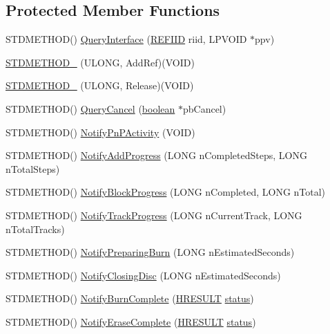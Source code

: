 \subsection*{Protected Member Functions}
\begin{DoxyCompactItemize}
\item 
S\+T\+D\+M\+E\+T\+H\+OD() \hyperlink{class_port_burn_progress_af13ab80c3a84826183cc542d091b0b1e}{Query\+Interface} (\hyperlink{px__win__ds_8c_a80ec49c8ae61e234197d5071d2df497d}{R\+E\+F\+I\+ID} riid, L\+P\+V\+O\+ID $\ast$ppv)
\item 
\hyperlink{class_port_burn_progress_a290522b6f07a4ff6ed2ce650bb3b7a46}{S\+T\+D\+M\+E\+T\+H\+O\+D\+\_\+} (U\+L\+O\+NG, Add\+Ref)(V\+O\+ID)
\item 
\hyperlink{class_port_burn_progress_a40d61559f171eca900115392db6dc586}{S\+T\+D\+M\+E\+T\+H\+O\+D\+\_\+} (U\+L\+O\+NG, Release)(V\+O\+ID)
\item 
S\+T\+D\+M\+E\+T\+H\+OD() \hyperlink{class_port_burn_progress_a35455bb10ed80d2eb80462b19765859d}{Query\+Cancel} (\hyperlink{cext_8h_a7670a4e8a07d9ebb00411948b0bbf86d}{boolean} $\ast$pb\+Cancel)
\item 
S\+T\+D\+M\+E\+T\+H\+OD() \hyperlink{class_port_burn_progress_a26ebcc7b69df400a910a9670fc1e2d48}{Notify\+Pn\+P\+Activity} (V\+O\+ID)
\item 
S\+T\+D\+M\+E\+T\+H\+OD() \hyperlink{class_port_burn_progress_a52417e3ed6e582c5cec8eb49620099d5}{Notify\+Add\+Progress} (L\+O\+NG n\+Completed\+Steps, L\+O\+NG n\+Total\+Steps)
\item 
S\+T\+D\+M\+E\+T\+H\+OD() \hyperlink{class_port_burn_progress_ad8149de00707fde296c46bf137ee9529}{Notify\+Block\+Progress} (L\+O\+NG n\+Completed, L\+O\+NG n\+Total)
\item 
S\+T\+D\+M\+E\+T\+H\+OD() \hyperlink{class_port_burn_progress_a343449b38df0598ac453bda0dd1bdcaa}{Notify\+Track\+Progress} (L\+O\+NG n\+Current\+Track, L\+O\+NG n\+Total\+Tracks)
\item 
S\+T\+D\+M\+E\+T\+H\+OD() \hyperlink{class_port_burn_progress_a94f31073c21939e3b8d4b77e02113e75}{Notify\+Preparing\+Burn} (L\+O\+NG n\+Estimated\+Seconds)
\item 
S\+T\+D\+M\+E\+T\+H\+OD() \hyperlink{class_port_burn_progress_a8968f4d5363998d9e66e32473ce015c1}{Notify\+Closing\+Disc} (L\+O\+NG n\+Estimated\+Seconds)
\item 
S\+T\+D\+M\+E\+T\+H\+OD() \hyperlink{class_port_burn_progress_a1aba8f2a6bfb1be97b6f677867b4a5cf}{Notify\+Burn\+Complete} (\hyperlink{px__win__ds_8c_a6ad46d30b0323d7b029e41f32f8a2571}{H\+R\+E\+S\+U\+LT} \hyperlink{rfft2d_test_m_l_8m_a1b5437a866e6f95107b07ba845bc1800}{status})
\item 
S\+T\+D\+M\+E\+T\+H\+OD() \hyperlink{class_port_burn_progress_a745925a9e4e3dd7606bc0bc6b4329e62}{Notify\+Erase\+Complete} (\hyperlink{px__win__ds_8c_a6ad46d30b0323d7b029e41f32f8a2571}{H\+R\+E\+S\+U\+LT} \hyperlink{rfft2d_test_m_l_8m_a1b5437a866e6f95107b07ba845bc1800}{status})
\end{DoxyCompactItemize}


